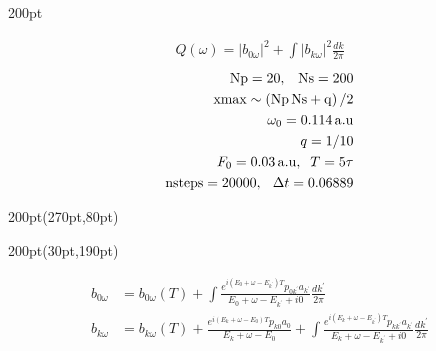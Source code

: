 \begin{frame}
\begin{textblock*}{200pt}
{\begin{minipage}{\linewidth}
{\footnotesize
\begin{align}
  Q(\omega) = \left| b_{0\omega}\right|^2
        + \int \left| b_{k\omega}\right|^2 \frac{dk}{2\pi} \nonumber
\end{align}
        \begin{align}
                \rm{Np} = 20,\;\;\;\rm{Ns} = 200 \nonumber\\
                \rm{xmax} \sim \left(\rm{Np\,Ns}+q\right)/2 \nonumber\\
                \omega_0 = 0.114\,{\rm a.u}\nonumber\\
                q=1/10\nonumber\\
                F_0 = 0.03\,{\rm a.u}, \;\;T=5\tau\nonumber\\
                {\rm nsteps} = 20 000,\, \;\;\Delta t=0.06889\nonumber
        \end{align}

}
\end{minipage}
}
\end{textblock*}




\begin{textblock*}{200pt}(270pt,80pt)
\end{textblock*}



\begin{textblock*}{200pt}(30pt,190pt)
\footnotesize

\begin{align}
b_{0\omega} & = b_{0\omega}(T)
 +\int\frac{e^{i(E_0+\omega-E_{k^\prime})T}p_{0k^\prime}a_{k^\prime}}
{E_0+\omega-E_{k^\prime} + i0} \frac{dk^\prime}{2\pi} \nonumber\\
b_{k\omega} & = b_{k\omega}(T)
 +\frac{e^{i(E_k+\omega-E_0)T}p_{k0}a_0}{E_k+\omega-E_0}
 +\int\frac{e^{i(E_k+\omega-E_{k^\prime})T}p_{kk^\prime}a_{k^\prime}}
{E_k+\omega-E_{k^\prime} + i0} \frac{dk^\prime}{2\pi} \nonumber
\end{align}


\end{textblock*}
\end{frame}

